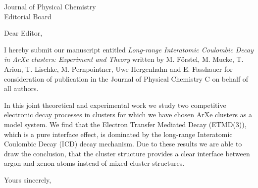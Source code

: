 \documentclass[DIN,10pt,pagenumber=false,parskip=half,fromalign=left,fromphone=false,fromemail=true,fromurl=false,fromlogo=true,fromrule=false]{scrlttr2}
\begin{document}
\begin{letter}{Journal of Physical Chemistry\\Editorial Board}
\opening{Dear Editor,}

I hereby submit our manuscript entitled
\emph{Long-range Interatomic Coulombic Decay in ArXe clusters: Experiment and
Theory} written by M. Förstel, M. Mucke, T. Arion, T. Lischke, M. Pernpointner,
Uwe Hergenhahn and E. Fasshauer for consideration of publication in
the Journal of Physical Chemistry C on behalf of all authors.

In this joint theoretical and experimental work we study two competitive
electronic decay processes in clusters for which we have chosen ArXe clusters
as a model system. We find that the Electron Transfer Mediated Decay (ETMD(3)),
which is a pure interface effect,
is dominated by the long-range Interatomic Coulombic Decay (ICD)
decay mechanism. Due to these results we
are able to draw the conclusion, that the cluster structure provides a clear
interface between argon and xenon atoms instead of mixed cluster structures.

\closing{Yours sincerely,}
\end{letter}
\end{document}
